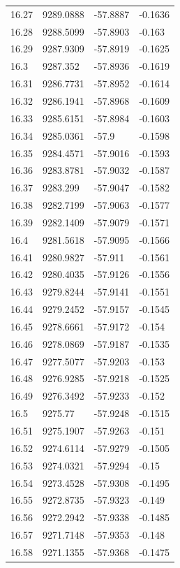 \begin{table}[H]
\begin{tabular}{llll}
16.27 & 9289.0888 & -57.8887 & -0.1636 \\
16.28 & 9288.5099 & -57.8903 & -0.163 \\
16.29 & 9287.9309 & -57.8919 & -0.1625 \\
16.3 & 9287.352 & -57.8936 & -0.1619 \\
16.31 & 9286.7731 & -57.8952 & -0.1614 \\
16.32 & 9286.1941 & -57.8968 & -0.1609 \\
16.33 & 9285.6151 & -57.8984 & -0.1603 \\
16.34 & 9285.0361 & -57.9 & -0.1598 \\
16.35 & 9284.4571 & -57.9016 & -0.1593 \\
16.36 & 9283.8781 & -57.9032 & -0.1587 \\
16.37 & 9283.299 & -57.9047 & -0.1582 \\
16.38 & 9282.7199 & -57.9063 & -0.1577 \\
16.39 & 9282.1409 & -57.9079 & -0.1571 \\
16.4 & 9281.5618 & -57.9095 & -0.1566 \\
16.41 & 9280.9827 & -57.911 & -0.1561 \\
16.42 & 9280.4035 & -57.9126 & -0.1556 \\
16.43 & 9279.8244 & -57.9141 & -0.1551 \\
16.44 & 9279.2452 & -57.9157 & -0.1545 \\
16.45 & 9278.6661 & -57.9172 & -0.154 \\
16.46 & 9278.0869 & -57.9187 & -0.1535 \\
16.47 & 9277.5077 & -57.9203 & -0.153 \\
16.48 & 9276.9285 & -57.9218 & -0.1525 \\
16.49 & 9276.3492 & -57.9233 & -0.152 \\
16.5 & 9275.77 & -57.9248 & -0.1515 \\
16.51 & 9275.1907 & -57.9263 & -0.151 \\
16.52 & 9274.6114 & -57.9279 & -0.1505 \\
16.53 & 9274.0321 & -57.9294 & -0.15 \\
16.54 & 9273.4528 & -57.9308 & -0.1495 \\
16.55 & 9272.8735 & -57.9323 & -0.149 \\
16.56 & 9272.2942 & -57.9338 & -0.1485 \\
16.57 & 9271.7148 & -57.9353 & -0.148 \\
16.58 & 9271.1355 & -57.9368 & -0.1475 \\

\end{tabular}
\end{table}

